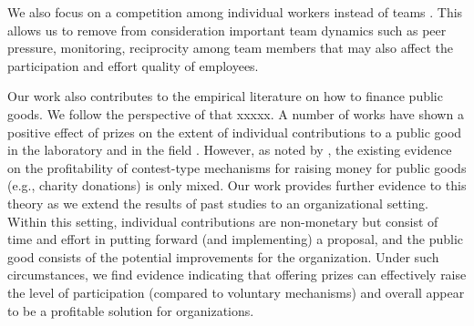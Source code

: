 \documentclass[12pt, titlepage]{article}
\begin{document}
We also focus on a competition among individual workers instead of teams
\citep[e.g.,][\citet{hamilton2003team} and more recently
\citet{gibbs2014field}]{erev1993constructive}. This allows us to remove
from consideration important team dynamics such as peer pressure,
monitoring, reciprocity among team members that may also affect the
participation and effort quality of employees.

Our work also contributes to the empirical literature on how to finance
public goods. We follow the perspective of \citet{morgan2000financing}
that xxxxx. A number of works have shown a positive effect of prizes on
the extent of individual contributions to a public good in the
laboratory \citep{morgan2000funding, dale2004charitable, lange2007using}
and in the field \citep{landry2006toward}. However, as noted by
\citet{vesterlund2012voluntary}, the existing evidence on the
profitability of contest-type mechanisms for raising money for public
goods (e.g., charity donations) is only mixed. Our work provides further
evidence to this theory as we extend the results of past studies to an
organizational setting. Within this setting, individual contributions
are non-monetary but consist of time and effort in putting forward (and
implementing) a proposal, and the public good consists of the potential
improvements for the organization. Under such circumstances, we find
evidence indicating that offering prizes can effectively raise the level
of participation (compared to voluntary mechanisms) and overall appear
to be a profitable solution for organizations.
\end{document}
